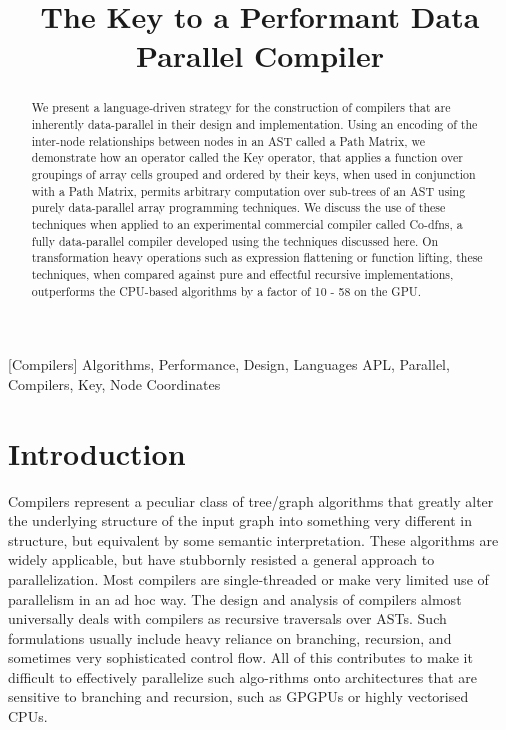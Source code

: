 ﻿\documentclass[numbers,10pt,preprint]{sigplanconf}
\begin{document}
\title{The Key to a Performant Data Parallel Compiler}
\maketitle

\begin{abstract}
We present a language-driven strategy for the construction of compilers that are inherently data-parallel in their design and implementation. Using an encoding of the inter-node relationships between nodes in an AST called a Path Matrix, we demonstrate how an operator called the Key operator, that applies a function over groupings of array cells grouped and ordered by their keys, when used in conjunction with a Path Matrix, permits arbitrary computation over sub-trees of an AST using purely data-parallel array programming techniques. We discuss the use of these techniques when applied to an experimental commercial compiler called Co-dfns, a fully data-parallel compiler developed using the techniques discussed here. On transformation heavy operations such as expression flattening or function lifting, these techniques, when compared against pure and effectful recursive implementations, outperforms the CPU-based algorithms by a factor of 10 - 58 on the GPU. 
\end{abstract}

[Compilers]
\terms Algorithms, Performance, Design, Languages
\keywords APL, Parallel, Compilers, Key, Node Coordinates

\section{Introduction}

Compilers represent a peculiar class of tree/graph algorithms that greatly alter the underlying structure of the input graph into something very different in structure, but equivalent by some semantic interpretation. These algorithms are widely applicable, but have stubbornly resisted a general approach to parallelization. Most compilers are single-threaded or make very limited use of parallelism in an ad hoc way. The design and analysis of compilers almost universally deals with compilers as recursive traversals over ASTs. Such formulations usually include heavy reliance on branching, recursion, and sometimes very sophisticated control flow. All of this contributes to make it difficult to effectively parallelize such algo-rithms onto architectures that are sensitive to branching and recursion, such as GPGPUs or highly vectorised CPUs.
\end{document}
